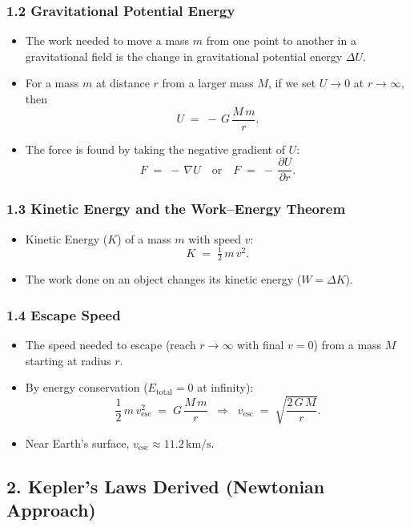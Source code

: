 \subsubsection{1.2 Gravitational Potential Energy}
\begin{itemize}
  \item The work needed to move a mass $m$ from one point to another in a gravitational field is the change in gravitational potential energy $\Delta U$.
  \item For a mass $m$ at distance $r$ from a larger mass $M$, if we set $U \to 0$ at $r \to \infty$, then
  \[
    U \;=\; -\,G\,\frac{M\,m}{r}.
  \]
  \item The force is found by taking the negative gradient of $U$:
  \[
    F \;=\; -\,\nabla U 
    \quad \text{or} \quad 
    F \;=\; -\,\frac{\partial U}{\partial r}.
  \]
\end{itemize}

\subsubsection{1.3 Kinetic Energy and the Work--Energy Theorem}
\begin{itemize}
  \item Kinetic Energy ($K$) of a mass $m$ with speed $v$:
  \[
    K \;=\; \tfrac{1}{2}\,m\,v^2.
  \]
  \item The work done on an object changes its kinetic energy ($W = \Delta K$).
\end{itemize}

\subsubsection{1.4 Escape Speed}
\begin{itemize}
  \item The speed needed to escape (reach $r \to \infty$ with final $v=0$) from a mass $M$ starting at radius $r$.
  \item By energy conservation ($E_{\text{total}} = 0$ at infinity):
  \[
    \frac{1}{2}\,m\,v_{\text{esc}}^2 
    \;=\;
    G\,\frac{M\,m}{r}
    \;\;\Longrightarrow\;\;
    v_{\text{esc}}
    \;=\;
    \sqrt{\frac{2\,G\,M}{r}}.
  \]
  \item Near Earth’s surface, $v_{\text{esc}} \approx 11.2\,\text{km/s}$.
\end{itemize}

\subsection{2. Kepler’s Laws Derived (Newtonian Approach)}

